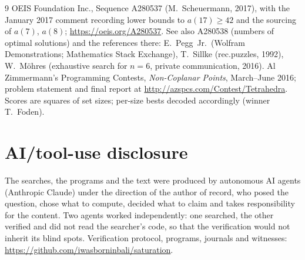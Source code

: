 \documentclass[11pt,a4paper]{article}
\begin{document}
\begin{thebibliography}{9}
 OEIS Foundation Inc., Sequence A280537 (M.~Scheuermann, 2017), with the
January 2017 comment recording lower bounds to $a(17)\ge42$ and the sourcing of $a(7)$, $a(8)$;
\url{https://oeis.org/A280537}.  See also A280538 (numbers of optimal solutions) and the
references there: E.~Pegg~Jr.\ (Wolfram Demonstrations; Mathematics Stack Exchange), T.~Sillke
(rec.puzzles, 1992), W.~M\"ohres (exhaustive search for $n=6$, private communication, 2016).
 Al Zimmermann's Programming Contests, \emph{Non-Coplanar Points}, March--June
2016; problem statement and final report at \url{http://azspcs.com/Contest/Tetrahedra}.  Scores
are squares of set sizes; per-size bests decoded accordingly (winner T.~Foden).
\end{thebibliography}

\section*{AI/tool-use disclosure}
The searches, the programs and the text were produced by autonomous AI agents (Anthropic Claude)
under the direction of the author of record, who posed the question, chose what to compute,
decided what to claim and takes responsibility for the content.  Two agents worked independently:
one searched, the other verified and did not read the searcher's code, so that the verification
would not inherit its blind spots.  Verification protocol, programs, journals and witnesses:
\url{https://github.com/iwasborninbali/saturation}.
\end{document}
